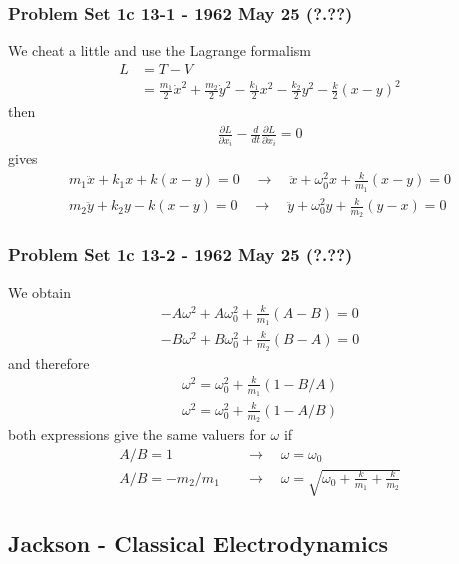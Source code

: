 \documentclass[10pt,a4paper]{book}
\theoremstyle{definition}
\begin{document}
\subsubsection{Problem Set 1c 13-1 - 1962 May 25 (?.??)}
We cheat a little and use the Lagrange formalism 
\begin{align}
L&=T-V\\
&=\frac{m_1}{2}\dot{x}^2+\frac{m_2}{2}\dot{y}^2-\frac{k_1}{2}x^2-\frac{k_2}{2}y^2-\frac{k}{2}(x-y)^2
\end{align}
then
\begin{align}
\frac{\partial L}{\partial x_i}-\frac{d}{dt}\frac{\partial L}{\partial\dot{x}_i}=0
\end{align}
gives
\begin{align}
m_1\ddot{x}+k_1x+k(x-y)=0\quad\rightarrow\quad \ddot{x}+\omega_0^2x+\frac{k}{m_1}(x-y)=0\\
m_2\ddot{y}+k_2y-k(x-y)=0\quad\rightarrow\quad \ddot{y}+\omega_0^2y+\frac{k}{m_2}(y-x)=0
\end{align}


\subsubsection{Problem Set 1c  13-2 - 1962 May 25 (?.??)}
We obtain
\begin{align}
-A\omega^2+A\omega_0^2+\frac{k}{m_1}(A-B)=0\\
-B\omega^2+B\omega_0^2+\frac{k}{m_2}(B-A)=0
\end{align}
and therefore
\begin{align}
\omega^2=\omega_0^2+\frac{k}{m_1}(1-B/A)\\
\omega^2=\omega_0^2+\frac{k}{m_2}(1-A/B)
\end{align}
both expressions give the same valuers for $\omega$ if
\begin{align}
A/B=1\quad&\rightarrow\quad \omega=\omega_0\\
A/B=-m_2/m_1\quad&\rightarrow\quad \omega=\sqrt{\omega_0+\frac{k}{m_1}+\frac{k}{m_2}}
\end{align} 

\subsection{{\sc Jackson} - Classical Electrodynamics}
\end{document}
